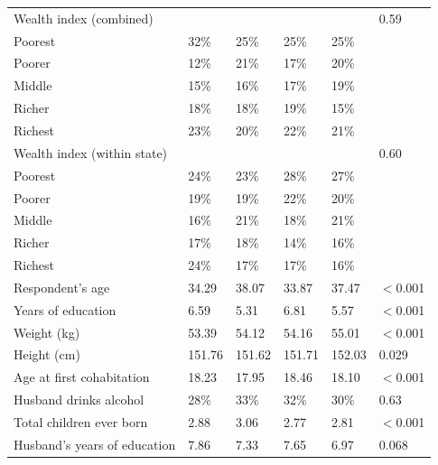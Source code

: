 \documentclass{article}
\begin{document}
\begin{landscape}
\begin{longtable}{@{}p{6cm}p{2.5cm}p{2.5cm}p{2.5cm}p{2.5cm}p{1.5cm}@{}}
\quad Wealth index (combined)                &        &        &        &        & 0.59     \\
\quad\quad Poorest                           & 32\%   & 25\%   & 25\%   & 25\%   &          \\
\quad\quad Poorer                            & 12\%   & 21\%   & 17\%   & 20\%   &          \\
\quad\quad Middle                            & 15\%   & 16\%   & 17\%   & 19\%   &          \\
\quad\quad Richer                            & 18\%   & 18\%   & 19\%   & 15\%   &          \\
\quad\quad Richest                           & 23\%   & 20\%   & 22\%   & 21\%   &          \\[4pt]

\quad Wealth index (within state)            &        &        &        &        & 0.60     \\
\quad\quad Poorest                           & 24\%   & 23\%   & 28\%   & 27\%   &          \\
\quad\quad Poorer                            & 19\%   & 19\%   & 22\%   & 20\%   &          \\
\quad\quad Middle                            & 16\%   & 21\%   & 18\%   & 21\%   &          \\
\quad\quad Richer                            & 17\%   & 18\%   & 14\%   & 16\%   &          \\
\quad\quad Richest                           & 24\%   & 17\%   & 17\%   & 16\%   &          \\[4pt]

\quad Respondent's age                       & 34.29  & 38.07  & 33.87  & 37.47  & $<$0.001 \\
\quad Years of education                     & 6.59   & 5.31   & 6.81   & 5.57   & $<$0.001 \\
\quad Weight (kg)                            & 53.39  & 54.12  & 54.16  & 55.01  & $<$0.001 \\
\quad Height (cm)                            & 151.76 & 151.62 & 151.71 & 152.03 & 0.029    \\
\quad Age at first cohabitation              & 18.23  & 17.95  & 18.46  & 18.10  & $<$0.001 \\
\quad Husband drinks alcohol                 & 28\%   & 33\%   & 32\%   & 30\%   & 0.63     \\
\quad Total children ever born               & 2.88   & 3.06   & 2.77   & 2.81   & $<$0.001 \\
\quad Husband's years of education           & 7.86   & 7.33   & 7.65   & 6.97   & 0.068    \\

\end{longtable}

\end{landscape}
\end{document}
